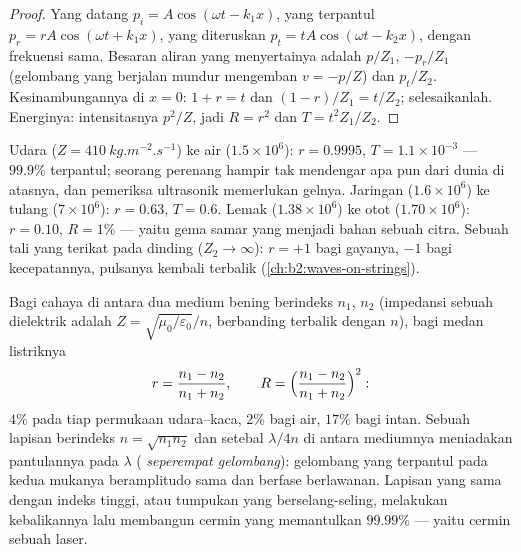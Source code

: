 \begin{proof}
Yang datang $p_i = A\cos(\omega t - k_1x)$, yang terpantul $p_r = rA\cos(\omega t + k_1x)$,
yang diteruskan $p_t = tA\cos(\omega t - k_2x)$, dengan frekuensi sama. Besaran aliran
yang menyertainya adalah $p/Z_1$, $-p_r/Z_1$ (gelombang yang berjalan mundur mengemban
$v = -p/Z$) dan $p_t/Z_2$. Kesinambungannya di $x = 0$: $1 + r = t$ dan $(1 - r)/Z_1
= t/Z_2$; selesaikanlah. Energinya: intensitasnya $p^2/Z$, jadi $R = r^2$ dan
$T = t^2Z_1/Z_2$.
\end{proof}

\begin{example}\label{ex:b2:wave-interfaces:sound}
Udara ($Z = \qty{410}{kg.m^{-2}.s^{-1}}$) ke air ($1.5 \times 10^6$): $r = 0.9995$,
$T = 1.1 \times 10^{-3}$ --- $99.9\%$ terpantul; seorang perenang hampir tak mendengar apa pun
dari dunia di atasnya, dan pemeriksa ultrasonik memerlukan gelnya. Jaringan
($1.6 \times 10^6$) ke tulang ($7 \times 10^6$): $r = 0.63$, $T = 0.6$. Lemak ($1.38 \times
10^6$) ke otot ($1.70 \times 10^6$): $r = 0.10$, $R = 1\%$ --- yaitu gema samar yang menjadi bahan
sebuah citra. Sebuah tali yang terikat pada dinding ($Z_2 \to \infty$): $r = +1$ bagi
gayanya, $-1$ bagi kecepatannya, pulsanya kembali terbalik
(\cref{ch:b2:waves-on-strings}).
\end{example}

\begin{proposition}\label{prop:b2:wave-interfaces:optics}
Bagi cahaya di antara dua medium bening berindeks $n_1$, $n_2$ (impedansi
sebuah dielektrik adalah $Z = \sqrt{\mu_0/\varepsilon_0}/n$, berbanding terbalik
dengan $n$), bagi medan listriknya
\[
r = \frac{n_1 - n_2}{n_1 + n_2} , \qquad R = \Bigl(\frac{n_1 - n_2}{n_1 + n_2}\Bigr)^2 :
\]
$4\%$ pada tiap permukaan udara--kaca, $2\%$ bagi air, $17\%$ bagi intan. Sebuah
lapisan berindeks $n = \sqrt{n_1n_2}$ dan setebal $\lambda/4n$ di antara mediumnya
meniadakan pantulannya pada $\lambda$ (\emph{ seperempat
gelombang}): gelombang yang terpantul pada kedua mukanya beramplitudo sama
dan berfase berlawanan. Lapisan yang sama dengan indeks tinggi, atau tumpukan
 yang berselang-seling, melakukan kebalikannya lalu membangun
cermin yang memantulkan $99.99\%$ --- yaitu cermin sebuah laser.
\end{proposition}

